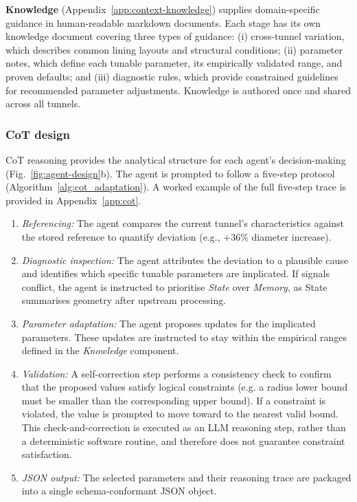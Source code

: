 \documentclass[a4paper,fleqn]{cas-dc}
\begin{document}
\textbf{Knowledge} (Appendix~\ref{app:context-knowledge}) supplies domain-specific guidance in human-readable markdown documents. Each stage has its own knowledge document covering three types of guidance: (i) cross-tunnel variation, which describes common lining layouts and structural conditions; (ii) parameter notes, which define each tunable parameter, its empirically validated range, and proven defaults; and (iii) diagnostic rules, which provide constrained guidelines for recommended parameter adjustments. Knowledge is authored once and shared across all tunnels. 



\subsubsection{CoT design}\label{sec:cot}

CoT reasoning provides the analytical structure for each agent's decision-making (Fig.~\ref{fig:agent-design}b). The agent is prompted to follow a five-step protocol (Algorithm~\ref{alg:cot_adaptation}). A worked example of the full five-step trace is provided in Appendix~\ref{app:cot}.

\begin{enumerate}
    \item \emph{Referencing:} The agent compares the current tunnel's characteristics against the stored reference to quantify deviation (e.g., $+36\%$ diameter increase).
    \item \emph{Diagnostic inspection:} The agent attributes the deviation to a plausible cause and identifies which specific tunable parameters are implicated. If signals conflict, the agent is instructed to prioritise \emph{State} over \emph{Memory}, as State summarises geometry after upstream processing.
    \item \emph{Parameter adaptation:} The agent proposes updates for the implicated parameters. These updates are instructed to stay within the empirical ranges defined in the \emph{Knowledge} component.
    \item \emph{Validation:} A self-correction step performs a consistency check to confirm that the proposed values satisfy logical constraints (e.g. a radius lower bound must be smaller than the corresponding upper bound). If a constraint is violated, the value is prompted to move toward to the nearest valid bound. This check-and-correction is executed as an LLM reasoning step, rather than a deterministic software routine, and therefore does not guarantee constraint satisfaction.
    \item \emph{JSON output:} The selected parameters and their reasoning trace are packaged into a single schema-conformant JSON object.
\end{enumerate}
\end{document}
